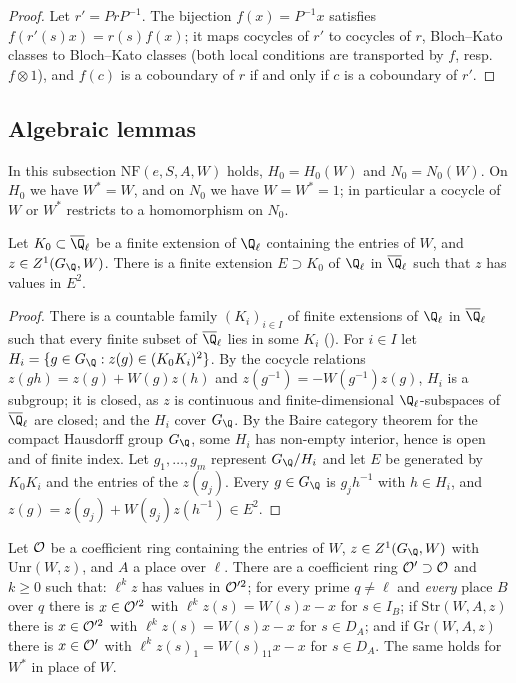\begin{proof}
Let $r'=PrP^{-1}$. The bijection $f(x)=P^{-1}x$ satisfies $f(r'(s)x)=r(s)f(x)$; it maps cocycles of $r'$ to cocycles
of $r$, Bloch--Kato classes to Bloch--Kato classes (both local conditions are transported by $f$, resp.\ $f\otimes1$), and
$f(c)$ is a coboundary of $r$ if and only if $c$ is a coboundary of $r'$.
\end{proof}

\subsection{Algebraic lemmas}\label{pf:kato:sec:alg}

In this subsection $\mathrm{NF}(e,S,A,W)$ holds, $H_0=H_0(W)$ and $N_0=N_0(W)$. On $H_0$ we have $W^*=W$, and on
$N_0$ we have $W=W^*=1$; in particular a cocycle of $W$ or $W^*$ restricts to a homomorphism on $N_0$.

\begin{lemma}\label{pf:kato:finext}
Let $K_0\subset\katoQlb$ be a finite extension of $\Q_\ell$ containing the entries of $W$, and $z\in\katoZ(G_\Q,W)$. There is a finite
extension $E\supset K_0$ of $\Q_\ell$ in $\katoQlb$ such that $z$ has values in $E^2$.
\end{lemma}

\begin{proof}
There is a countable family $(K_i)_{i\in I}$ of finite extensions of $\Q_\ell$ in $\katoQlb$ such that every finite subset of $\katoQlb$
lies in some $K_i$ (). For $i\in I$ let
$H_i=\{g\in G_\Q:z(g)\in(K_0K_i)^2\}$. By the cocycle relations $z(gh)=z(g)+W(g)z(h)$ and $z(g^{-1})=-W(g^{-1})z(g)$, $H_i$ is a subgroup;
it is closed, as $z$ is continuous and finite-dimensional $\Q_\ell$-subspaces of $\katoQlb$ are closed; and the $H_i$ cover $G_\Q$. By
the Baire category theorem for the compact Hausdorff group $G_\Q$, some $H_i$ has non-empty interior, hence is open and of finite
index. Let $g_1,\dots,g_m$ represent $G_\Q/H_i$ and let $E$ be generated by $K_0K_i$ and the entries of the $z(g_j)$. Every $g\in G_\Q$
is $g_jh^{-1}$ with $h\in H_i$, and $z(g)=z(g_j)+W(g_j)z(h^{-1})\in E^2$.
\end{proof}

\begin{lemma}\label{pf:kato:scaling}
Let $\mathcal{O}$ be a coefficient ring containing the entries of $W$, $z\in\katoZ(G_\Q,W)$ with $\mathrm{Unr}(W,z)$, and $A$ a
place over $\ell$. There are a coefficient ring $\mathcal{O}'\supset\mathcal{O}$ and $k\ge0$ such that: $\ell^kz$ has values in
$\mathcal{O}'^2$; for every prime $q\ne\ell$ and \emph{every} place $B$ over $q$ there is $x\in\mathcal{O}'^2$ with
$\ell^kz(s)=W(s)x-x$ for $s\in I_B$; if $\mathrm{Str}(W,A,z)$ there is $x\in\mathcal{O}'^2$ with $\ell^kz(s)=W(s)x-x$ for
$s\in D_A$; and if $\mathrm{Gr}(W,A,z)$ there is $x\in\mathcal{O}'$ with $\ell^kz(s)_1=W(s)_{11}x-x$ for $s\in D_A$. The same holds
for $W^*$ in place of $W$.
\end{lemma}

